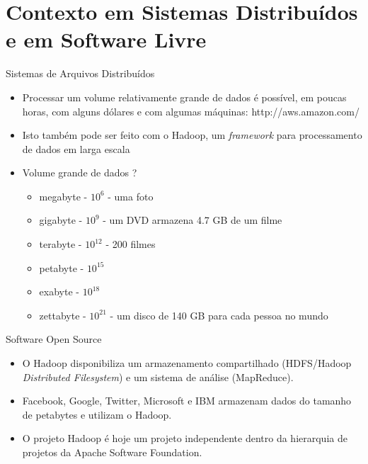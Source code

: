  \section{Contexto em Sistemas Distribuídos e em Software Livre}

  \begin{frame}{Sistemas de Arquivos Distribuídos}
     \begin{itemize}
      \item<1-> Processar um volume relativamente grande de dados é possível, em poucas horas, com alguns dólares e com algumas máquinas: http://aws.amazon.com/
      \item<2-> Isto também pode ser feito com o Hadoop, um \emph{framework} para processamento de dados em larga escala
      \item<3-> Volume grande de dados ?
          \begin{itemize}
             \item<4-> megabyte - $10^6$ - uma foto
             \item<5-> gigabyte - $10^9$ - um DVD armazena 4.7 GB de um filme
             \item<6-> terabyte - $10^{12}$ - 200 filmes
             \item<7-> petabyte - $10^{15}$
             \item<8-> exabyte - $10^{18}$
             \item<9-> zettabyte - $10^{21}$ - um disco de 140 GB para cada pessoa no mundo
          \end{itemize}
     \end{itemize}
  \end{frame}

  \begin{frame}{Software Open Source}
     \begin{itemize}
        \item<1-> O Hadoop disponibiliza um armazenamento compartilhado (HDFS/Hadoop \emph{Distributed Filesystem}) e um sistema de análise (MapReduce).
         \item<2-> Facebook, Google, Twitter, Microsoft e IBM armazenam dados do tamanho de petabytes e utilizam o Hadoop.
         \item<3-> O projeto Hadoop é hoje um projeto independente dentro da hierarquia de projetos da Apache Software Foundation.
     \end{itemize}
  \end{frame}

